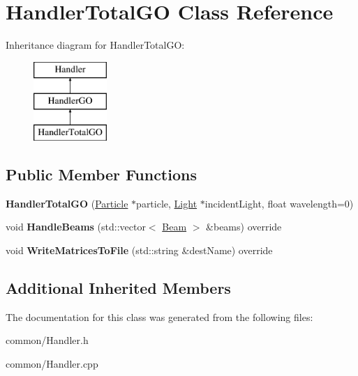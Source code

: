 \hypertarget{class_handler_total_g_o}{}\section{Handler\+Total\+GO Class Reference}
\label{class_handler_total_g_o}
Inheritance diagram for Handler\+Total\+GO\+:\begin{figure}[H]
\begin{center}
\leavevmode
\includegraphics[height=3.000000cm]{class_handler_total_g_o}
\end{center}
\end{figure}
\subsection*{Public Member Functions}
\begin{DoxyCompactItemize}
\item 
\mbox{\label{class_handler_total_g_o_a875f12f02fcb152d084b249a353f523e}} 
{\bfseries Handler\+Total\+GO} (\mbox{\hyperlink{class_particle}{Particle}} $\ast$particle, \mbox{\hyperlink{class_light}{Light}} $\ast$incident\+Light, float wavelength=0)
\item 
\mbox{\label{class_handler_total_g_o_ad8500e02d66519a915ad9156114df614}} 
void {\bfseries Handle\+Beams} (std\+::vector$<$ \mbox{\hyperlink{class_beam}{Beam}} $>$ \&beams) override
\item 
\mbox{\label{class_handler_total_g_o_a3548dbfd472665c922958af65ff576ec}} 
void {\bfseries Write\+Matrices\+To\+File} (std\+::string \&dest\+Name) override
\end{DoxyCompactItemize}
\subsection*{Additional Inherited Members}


The documentation for this class was generated from the following files\+:\begin{DoxyCompactItemize}
\item 
common/Handler.\+h\item 
common/Handler.\+cpp\end{DoxyCompactItemize}
